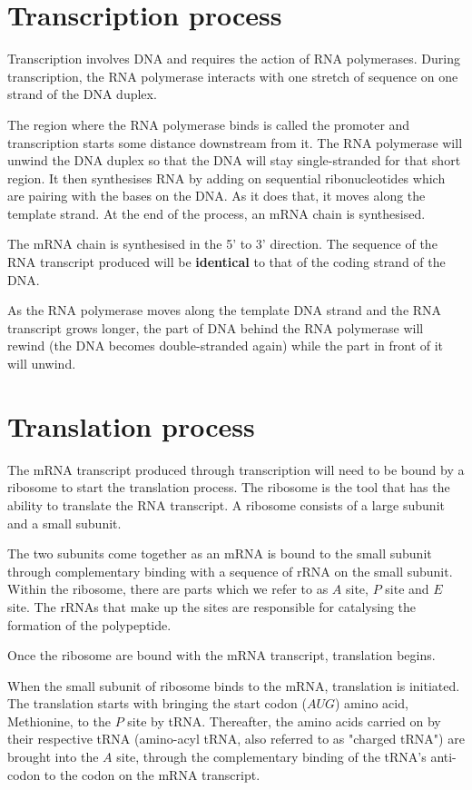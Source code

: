 \documentclass[11pt]{article}
\begin{document}
\newpage
\section{Transcription process}
\label{sec:org2c7a2e2}
Transcription involves DNA and requires the action of RNA polymerases. During transcription, the RNA polymerase interacts with one stretch of sequence on one strand of the DNA duplex.


The region where the RNA polymerase binds is called the promoter and transcription starts some distance downstream from it. The RNA polymerase will unwind the DNA duplex so that the DNA will stay single-stranded for that short region. It then synthesises RNA by adding on sequential ribonucleotides which are pairing with the bases on the DNA. As it does that, it moves along the template strand. At the end of the process, an mRNA chain is synthesised.


The mRNA chain is synthesised in the 5' to 3' direction. The sequence of the RNA transcript produced will be \textbf{identical} to that of the coding strand of the DNA.


As the RNA polymerase moves along the template DNA strand and the RNA transcript grows longer, the part of DNA behind the RNA polymerase will rewind (the DNA becomes double-stranded again) while the part in front of it will unwind.

\newpage
\section{Translation process}
\label{sec:org82bbc32}
The mRNA transcript produced through transcription will need to be bound by a ribosome to start the translation process. The ribosome is the tool that has the ability to translate the RNA transcript. A ribosome consists of a large subunit and a small subunit.


The two subunits come together as an mRNA is bound to the small subunit through complementary binding with a sequence of rRNA on the small subunit. Within the ribosome, there are parts which we refer to as \(A\) site, \(P\) site and \(E\) site. The rRNAs that make up the sites are responsible for catalysing the formation of the polypeptide.


Once the ribosome are bound with the mRNA transcript, translation begins.


When the small subunit of ribosome binds to the mRNA, translation is initiated. The translation starts with bringing the start codon (\(AUG\)) amino acid, Methionine, to the \(P\) site by tRNA. Thereafter, the amino acids carried on by their respective tRNA (amino-acyl tRNA, also referred to as "charged tRNA") are brought into the \(A\) site, through the complementary binding of the tRNA's anti-codon to the codon on the mRNA transcript.
\end{document}
